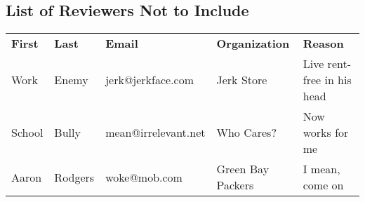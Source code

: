 \subsection*{List of Reviewers Not to Include}

\begin{tabular}[c]{lllll}
\textbf{First} & \textbf{Last} & \textbf{Email} & \textbf{Organization} & \textbf{Reason}\\
Work & Enemy & jerk@jerkface.com & Jerk Store & Live rent-free in his head\\
School & Bully & mean@irrelevant.net & Who Cares? & Now works for me\\
Aaron & Rodgers & woke@mob.com & Green Bay Packers & I mean, come on\\
\end{tabular}